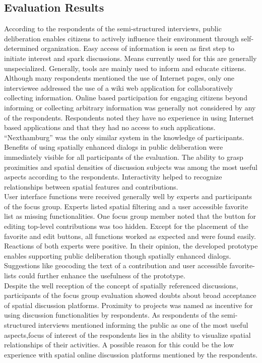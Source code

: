 \subsection{Evaluation Results}
\label{sub:evaluation-results}
According to the respondents of the semi-structured interviews, public deliberation enables citizens to actively influence their environment through self-determined organization. Easy access of information is seen as first step to initiate interest and spark discussions. Means currently used for this are generally unspecialized. Generally, tools are mainly used to inform and educate citizens. Although many respondents mentioned the use of Internet pages, only one interviewee addressed the use of a wiki web application for collaboratively collecting information. Online based participation for engaging citizens beyond informing or collecting arbitrary information was generally not considered by any of the respondents. Respondents noted they have no experience in using Internet based applications and that they had no access to such applications. ``Nexthamburg'' was the only similar system in the knowledge of participants.\\
Benefits of using spatially enhanced dialogs in public deliberation were immediately visible for all participants of the evaluation. The ability to grasp proximities and spatial densities of discussion subjects was among the most useful aspects according to the respondents. Interactivity helped to recognize relationships between spatial features and contributions.\\
User interface functions were received generally well by experts and participants of the focus group. Experts listed spatial filtering and a user accessible favorite list as missing functionalities. One focus group member noted that the button for editing top-level contributions was too hidden. Except for the placement of the favorite and edit buttons, all functions worked as expected and were found easily. Reactions of both experts were positive. In their opinion, the developed prototype enables supporting public deliberation though spatially enhanced dialogs. Suggestions like geocoding the text of a contribution and user accessible favorite-lists could further enhance the usefulness of the prototype.\\
Despite the well reception of the concept of spatially referenced discussions, participants of the focus group evaluation showed doubts about broad acceptance of spatial discussion platforms.  Proximity to projects was named as incentive for using discussion functionalities by respondents. As respondents of the semi-structured interviews mentioned informing the public as one of the most useful aspects,focus of interest of the respondents lies in the ability to visualize spatial relationships of their activities. A possible reason for this could be the low experience with spatial online discussion platforms mentioned by the respondents. \\
